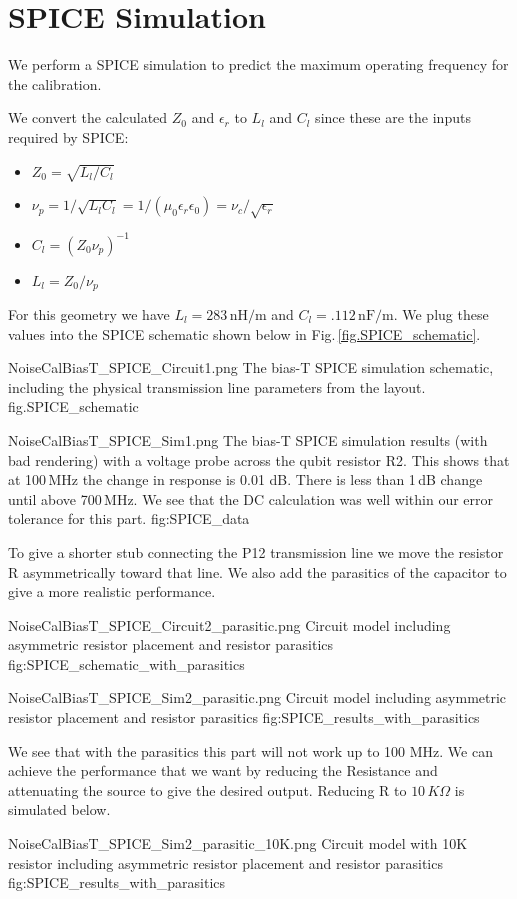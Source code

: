 \section{SPICE Simulation}
We perform a SPICE simulation to predict the maximum operating frequency for the calibration.

We convert the calculated $Z_0$ and $\epsilon_r$ to $L_l$ and $C_l$ since these are the inputs required by SPICE:
\begin{itemize}
\item $Z_0 = \sqrt{L_l / C_l}$
\item $\nu_p = 1/\sqrt{L_l C_l} = 1 / (\mu_0 \epsilon_r \epsilon_0) = \nu_c / \sqrt{\epsilon_r}$
\item $C_l = (Z_0 \nu_p)^{-1}$
\item $L_l = Z_0 / \nu_p$
\end{itemize}
For this geometry we have $L_l = 283\,\text{nH/m}$ and $C_l = .112\,\text{nF/m}$.
We plug these values into the SPICE schematic shown below in Fig.\,\ref{fig.SPICE_schematic}.

\quickfig{\columnwidth}
{NoiseCalBiasT_SPICE_Circuit1.png}
{
The bias-T SPICE simulation schematic, including the physical transmission line parameters from the layout.}
{fig.SPICE_schematic}

\quickfig{\columnwidth}
{NoiseCalBiasT_SPICE_Sim1.png}
{
The bias-T SPICE simulation results (with bad rendering) with a voltage probe across the qubit resistor R2.
This shows that at 100\,MHz the change in response is 0.01 dB.
There is less than 1\,dB change until above 700\,MHz.
We see that the DC calculation was well within our error tolerance for this part.}
{fig:SPICE_data}

To give a shorter stub connecting the P12 transmission line we move the resistor R asymmetrically toward that line.  We also add the parasitics of the capacitor to give a more realistic performance.

\quickfig{\columnwidth}
{NoiseCalBiasT_SPICE_Circuit2_parasitic.png}
{
Circuit model including asymmetric resistor placement and resistor parasitics}
{fig:SPICE_schematic_with_parasitics}

\quickfig{\columnwidth}
{NoiseCalBiasT_SPICE_Sim2_parasitic.png}
{
Circuit model including asymmetric resistor placement and resistor parasitics}
{fig:SPICE_results_with_parasitics}

We see that with the parasitics this part will not work up to 100 MHz.  We can achieve the performance that we want by reducing the Resistance and attenuating the source to give the desired output.  Reducing R to $10$\,$K\Omega$ is simulated below.

\quickfig{\columnwidth}
{NoiseCalBiasT_SPICE_Sim2_parasitic_10K.png}
{
Circuit model with 10K resistor including asymmetric resistor placement and resistor parasitics}
{fig:SPICE_results_with_parasitics}


\begin{comment}
To predict the maximum frequency of operation for this bias T were going to do a SPICE simulation of the circuit below where the parasitic capacitance is from a COMSOL simulation.
\end{comment}

% 